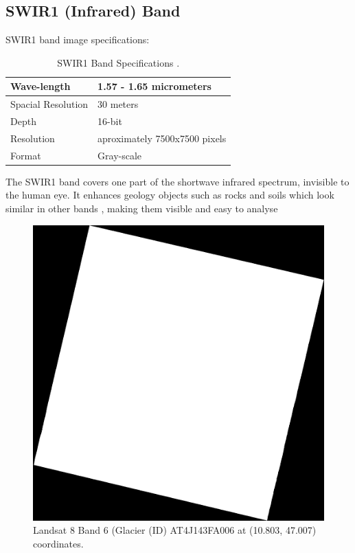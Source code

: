 \documentclass[12pt, a4paper]{report}
\begin{document}
	\subsection{SWIR1 (Infrared) Band}
	SWIR1 band image specifications:
	\begin{table} [H]
		\center
		\begin{tabular} {|  l | L{10cm} |}
			\hline
			Wave-length & 1.57 - 1.65 micrometers \\ [0.2ex]
			\hline
			Spacial Resolution & 30 meters \\ [0.2ex]
			\hline
			Depth & 16-bit \\ [0.2ex]
			\hline
			Resolution & aproximately 7500x7500 pixels \\ [0.2ex]
			\hline 
			Format & Gray-scale \\ [0.2ex]
			\hline
		\end{tabular}
		\caption{SWIR1 Band Specifications \cite{band_information, band_combination}.}
		\label{table:swir1_band_specifications}
	\end{table}
	The SWIR1 band covers one part of the shortwave infrared spectrum, invisible to the human eye. It enhances geology objects such as rocks and soils which look similar in other bands \cite{band_information}, making them visible and easy to analyse
	\begin{figure}[H]
		\centering
		\includegraphics[scale=1]{LC81930272018108LGN00_B6.png}
		\caption{Landsat 8 Band 6 (Glacier (ID) AT4J143FA006 at (10.803, 47.007) coordinates. 
			\cite{swir1_band}}
		\label{fig:band6}
	\end{figure}
\end{document}
